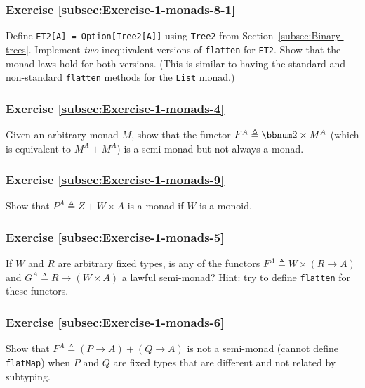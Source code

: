 \subsubsection{Exercise \label{subsec:Exercise-1-monads-8-1}\ref{subsec:Exercise-1-monads-8-1}}

Define \lstinline!ET2[A] = Option[Tree2[A]]! using \lstinline!Tree2!
from Section~\ref{subsec:Binary-trees}. Implement \emph{two} inequivalent
versions of \lstinline!flatten! for \lstinline!ET2!. Show that the
monad laws hold for both versions. (This is similar to having the
standard and non-standard \lstinline!flatten! methods for the \lstinline!List!
monad.)

\subsubsection{Exercise \label{subsec:Exercise-1-monads-4}\ref{subsec:Exercise-1-monads-4}}

Given an arbitrary monad $M$, show that the functor $F^{A}\triangleq\bbnum 2\times M^{A}$
(which is equivalent to $M^{A}+M^{A}$) is a semi-monad but not always
a monad.

\subsubsection{Exercise \label{subsec:Exercise-1-monads-9}\ref{subsec:Exercise-1-monads-9}}

Show that $P^{A}\triangleq Z+W\times A$ is a monad if $W$ is a monoid.

\subsubsection{Exercise \label{subsec:Exercise-1-monads-5}\ref{subsec:Exercise-1-monads-5}}

If $W$ and $R$ are arbitrary fixed types, is any of the functors
$F^{A}\triangleq W\times\left(R\rightarrow A\right)$ and $G^{A}\triangleq R\rightarrow\left(W\times A\right)$
a lawful semi-monad? Hint: try to define \lstinline!flatten! for
these functors.

\subsubsection{Exercise \label{subsec:Exercise-1-monads-6}\ref{subsec:Exercise-1-monads-6}}

Show that $F^{A}\triangleq\left(P\rightarrow A\right)+\left(Q\rightarrow A\right)$
is not a semi-monad (cannot define \lstinline!flatMap!) when $P$
and $Q$ are fixed types that are different and not related by subtyping.

